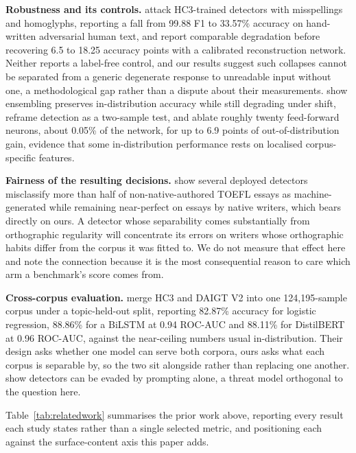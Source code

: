 \documentclass[conference,a4paper]{IEEEtran}
\begin{document}
\textbf{Robustness and its controls.} \citet{Antoun2023towards} attack HC3-trained detectors with misspellings and homoglyphs, reporting a fall from 99.88 F1 to 33.57\% accuracy on hand-written adversarial human text, and \citet{Huang2024generated} report comparable degradation before recovering 6.5 to 18.25 accuracy points with a calibrated reconstruction network. Neither reports a label-free control, and our results suggest such collapses cannot be separated from a generic degenerate response to unreadable input without one, a methodological gap rather than a dispute about their measurements. \citet{Lai2024adaptive} show ensembling preserves in-distribution accuracy while still degrading under shift, \citet{Zhang2024detecting} reframe detection as a two-sample test, and \citet{Borile2025generalize} ablate roughly twenty feed-forward neurons, about 0.05\% of the network, for up to 6.9 points of out-of-distribution gain, evidence that some in-distribution performance rests on localised corpus-specific features.

\textbf{Fairness of the resulting decisions.} \citet{Liang2023gpt} show several deployed detectors misclassify more than half of non-native-authored TOEFL essays as machine-generated while remaining near-perfect on essays by native writers, which bears directly on ours. A detector whose separability comes substantially from orthographic regularity will concentrate its errors on writers whose orthographic habits differ from the corpus it was fitted to. We do not measure that effect here and note the connection because it is the most consequential reason to care which arm a benchmark's score comes from.

\textbf{Cross-corpus evaluation.} \citet{Alikhanov2026generated} merge HC3 and DAIGT V2 into one 124,195-sample corpus under a topic-held-out split, reporting 82.87\% accuracy for logistic regression, 88.86\% for a BiLSTM at 0.94 ROC-AUC and 88.11\% for DistilBERT at 0.96 ROC-AUC, against the near-ceiling numbers usual in-distribution. Their design asks whether one model can serve both corpora, ours asks what each corpus is separable by, so the two sit alongside rather than replacing one another. \citet{Lu2023large} show detectors can be evaded by prompting alone, a threat model orthogonal to the question here.

Table~\ref{tab:relatedwork} summarises the prior work above, reporting every result each study states rather than a single selected metric, and positioning each against the surface-content axis this paper adds.
\end{document}
